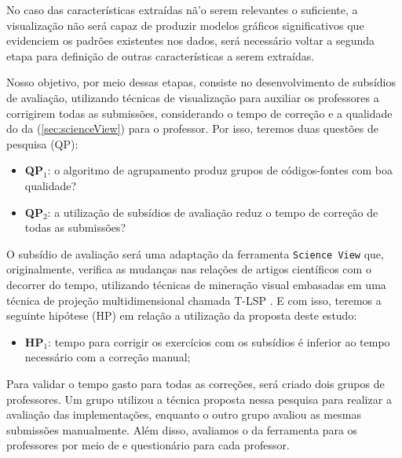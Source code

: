 	 	No caso das características extraídas nã'o serem relevantes o suficiente, a
	 	visualização não será capaz de produzir modelos gráficos significativos que
	 	evidenciem os padrões existentes nos dados, será necessário voltar a segunda
	 	etapa para definição de outras características a serem extraídas.
	 	
	 	Nosso objetivo, por meio dessas etapas, consiste no desenvolvimento de subsídios
	 	de avaliação, utilizando técnicas de visualização para auxiliar os professores a
	 	corrigirem todas as submissões, considerando o tempo de correção e a qualidade do
	 	 da  (\cref{sec:scienceView}) para o professor.
	 	Por isso, teremos duas questões de pesquisa (QP):
	 	
	 	\begin{itemize}
	 		\item \textbf{QP$_1$}: o algoritmo de agrupamento produz grupos de códigos-fontes
	 		com boa qualidade?
	 		\item \textbf{QP$_2$}: a utilização de subsídios de avaliação reduz o tempo %
	 		de correção de todas as submissões?
	 	\end{itemize}
	 	
	 	O subsídio de avaliação será uma adaptação da ferramenta \texttt{Science View}
	 	\cite{Alencar-etal:2012} que, originalmente, verifica as mudanças nas relações
	 	de artigos científicos com o decorrer do tempo, utilizando técnicas de mineração
	 	visual embasadas em uma técnica de projeção multidimensional chamada \acl{T-LSP}
	 	\cite{Alencar}. E com isso, teremos a seguinte hipótese (HP) em relação a
	 	utilização da proposta deste estudo:
	 	
	 	\begin{itemize}
	 		\item \textbf{HP$_1$}: tempo para corrigir os exercícios com os subsídios é inferior  %
	 		ao tempo necessário com a correção manual;
	 	\end{itemize}
	 	
	 	Para validar o tempo gasto para todas as correções, será criado dois grupos de
	 	professores. Um grupo utilizou a técnica proposta nessa pesquisa para realizar
	 	a avaliação das implementações, enquanto o outro grupo avaliou as mesmas submissões
	 	manualmente. Além disso, avaliamos o  da ferramenta para os
	 	professores por meio de  e questionário para cada professor.
	 		
